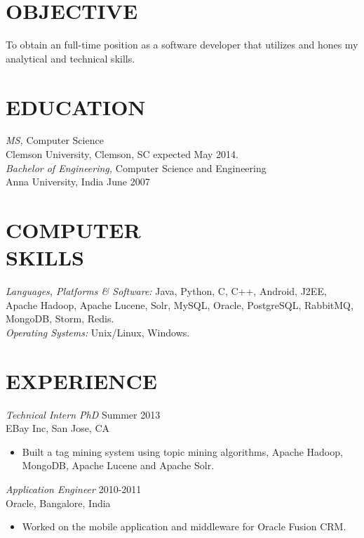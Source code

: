 \documentclass[line,margin]{res}
\begin{document}
\address{813 College Ave, Apt 23, Clemson, SC 29631}
\address{gyanasr@g.clemson.edu $\mid$ (864) 633-9988}

 
\begin{resume}
 
\section{OBJECTIVE}       To obtain an full-time position as a software developer that utilizes and hones my analytical and technical skills. 
 
\section{EDUCATION} 
{\sl MS,} Computer Science \\
                Clemson University, Clemson, SC 
                expected May 2014.\\
				{\sl Bachelor of Engineering,} Computer Science and Engineering \\
                Anna University, India 
                June 2007 \\
 
 
\section{COMPUTER \\ SKILLS} {\sl Languages, Platforms \& Software:} Java, Python, C, C++, Android, J2EE, Apache Hadoop, Apache Lucene, Solr, MySQL, Oracle, PostgreSQL, RabbitMQ, MongoDB, Storm, Redis. \\
                {\sl Operating Systems:}  Unix/Linux, Windows.
 
\section{EXPERIENCE} 
{\sl Technical Intern PhD} \hfill Summer 2013\\
                EBay Inc, San Jose, CA
                 \begin{itemize}  \itemsep -2pt %
                 \item Built a tag mining system using topic mining algorithms, Apache Hadoop, MongoDB, Apache Lucene and Apache Solr.
                \end{itemize}
{\sl Application Engineer} \hfill 2010-2011 \\
               Oracle, 
                Bangalore, India
                 \begin{itemize}  \itemsep -2pt %
                 \item Worked on the mobile application and middleware for
Oracle Fusion CRM. 
                \end{itemize}
 

\end{resume}
\end{document}
